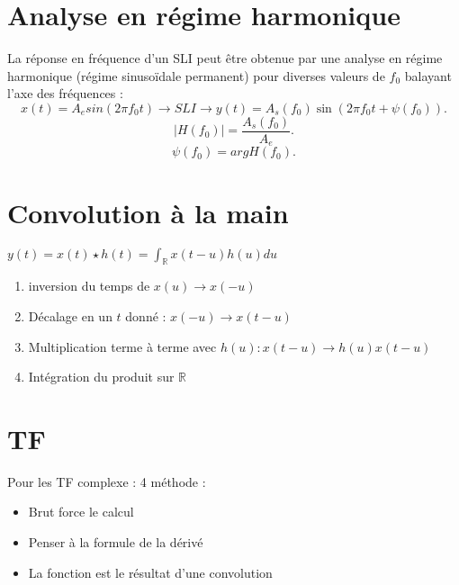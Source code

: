 \documentclass{article}
\begin{document}
\begin{multicols}{2}
    \section{Analyse en régime harmonique}
    La réponse en fréquence d'un SLI peut être obtenue par une analyse en régime harmonique (régime sinusoïdale permanent) pour diverses valeurs de $ f_0 $ balayant l'axe des fréquences :
    \[
        x(t) = A_e sin(2 \pi f_0 t) \to SLI \to y(t) = A_s(f_0) \sin (2 \pi f_0 t + \psi (f_0))
    .\]
    \[
        \left| H(f_0) \right| = \frac{A_s (f_0)}{A_e}
    .\]
    \[
        \psi (f_0) = arg H(f_0)
    .\]
    
    \section{Convolution à la main}
    $ y(t) = x(t) \star h(t) = \int_{\mathbb{R}}^{}x(t-u)h(u)du $ 
    \begin{enumerate}
        \item inversion du temps de $ x(u) \to x(-u) $
        \item Décalage en un $ t $ donné : $ x(-u) \to x(t - u) $
        \item Multiplication terme à terme avec $ h(u) : x(t - u) \to h(u)x(t-u) $  
        \item Intégration du produit sur $ \mathbb{R} $ 
    \end{enumerate}
    \section{TF}
    Pour les TF complexe : 4 méthode : \begin{itemize}
        \item Brut force le calcul
        \item Penser à la formule de la dérivé 
        \item La fonction est le résultat d'une convolution
    \end{itemize}    
    

\end{multicols}
\end{document}
